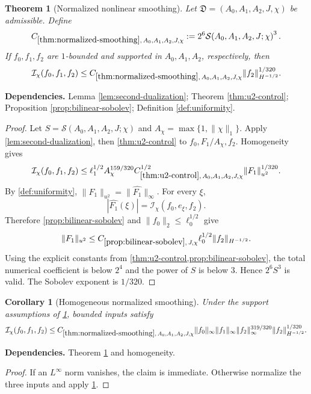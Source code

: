 \documentclass[11pt]{article}
\newtheorem{theorem}{Theorem}[section]
\newtheorem{corollary}[corollary]{Corollary}
\theoremstyle{definition}
\theoremstyle{remark}
\newcommand{\1}{\mathbf 1}
\newcommand{\FT}[1]{\widehat{#1}}
\newcommand{\Ichi}{\mathcal I_{\chi}}
\newcommand{\uNorm}[2]{\lVert #1\rVert_{u^{#2}}}
\newcommand{\hNorm}[2]{\lVert #1\rVert_{H^{#2}}}
\newcommand{\lpNorm}[2]{\lVert #1\rVert_{#2}}
\newcommand{\uses}[1]{\par\smallskip\noindent\textbf{Dependencies.} #1\par\smallskip}
\newcommand{\Ssize}[2]{\mathcal S\!\left(#1;#2\right)}
\begin{document}
\begin{theorem}[Normalized nonlinear smoothing]\label{thm:normalized-smoothing}
Let $\mathfrak D=(A_0,A_1,A_2,J,\chi)$ be admissible.  Define
\[
C_{\ref{thm:normalized-smoothing},\,A_0,A_1,A_2,J,\chi}
:=
2^6\Ssize{A_0,A_1,A_2,J}{\chi}^{3}.
\]
If $f_0,f_1,f_2$ are $1$-bounded and supported in $A_0,A_1,A_2$, respectively, then
\[
\Ichi(f_0,f_1,f_2)
\leq
C_{\ref{thm:normalized-smoothing},\,A_0,A_1,A_2,J,\chi}
\hNorm{f_2}{-1/2}^{1/320}.
\]
\end{theorem}

\uses{Lemma \ref{lem:second-dualization}; Theorem \ref{thm:u2-control}; Proposition \ref{prop:bilinear-sobolev}; Definition \ref{def:uniformity}.}

\begin{proof}
Let $S=\Ssize{A_0,A_1,A_2,J}{\chi}$ and
$A_\chi=\max\{1,\lpNorm\chi1\}$.  Apply \cref{lem:second-dualization}, then \cref{thm:u2-control} to
$f_0,F_1/A_\chi,f_2$.  Homogeneity gives
\[
\Ichi(f_0,f_1,f_2)
\leq
\ell_1^{1/2}A_\chi^{159/320}
C_{\ref{thm:u2-control},\,A_0,A_1,A_2,J,\chi}^{1/2}
\uNorm{F_1}2^{1/320}.
\]
By \cref{def:uniformity},
$\uNorm{F_1}2=\lpNorm{\FT{F_1}}\infty$.  For every $\xi$,
\[
|\FT{F_1}(\xi)|=\Ichi(f_0,e_\xi,f_2).
\]
Therefore \cref{prop:bilinear-sobolev} and
$\lpNorm{f_0}2\leq\ell_0^{1/2}$ give
\[
\uNorm{F_1}2
\leq
C_{\ref{prop:bilinear-sobolev},\,J,\chi}
\ell_0^{1/2}\hNorm{f_2}{-1/2}.
\]
Using the explicit constants from \cref{thm:u2-control,prop:bilinear-sobolev}, the total numerical coefficient is below $2^4$ and the power of $S$ is below $3$.  Hence $2^6S^3$ is valid.  The Sobolev exponent is $1/320$.
\end{proof}

\begin{corollary}[Homogeneous normalized smoothing]\label{cor:homogeneous-normalized}
Under the support assumptions of \cref{thm:normalized-smoothing}, bounded inputs satisfy
\[
\Ichi(f_0,f_1,f_2)
\leq
C_{\ref{thm:normalized-smoothing},\,A_0,A_1,A_2,J,\chi}
\lpNorm{f_0}\infty\lpNorm{f_1}\infty
\lpNorm{f_2}\infty^{319/320}
\hNorm{f_2}{-1/2}^{1/320}.
\]
\end{corollary}

\uses{Theorem \ref{thm:normalized-smoothing} and homogeneity.}

\begin{proof}
If an $L^\infty$ norm vanishes, the claim is immediate.  Otherwise normalize the three inputs and apply \cref{thm:normalized-smoothing}.
\end{proof}
\end{document}
